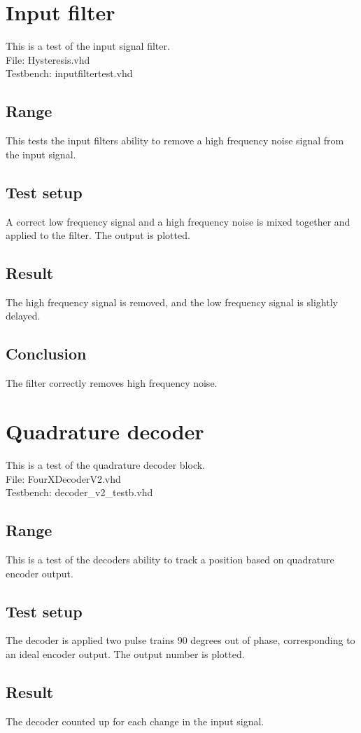 \section{Input filter}
This is a test of the input signal filter.\\
File: Hysteresis.vhd\\
Testbench: inputfiltertest.vhd
\subsection{Range}
This tests the input filters ability to remove a high frequency noise signal from the input signal.
\subsection{Test setup}
A correct low frequency signal and a high frequency noise is mixed together and applied to the filter. The output is plotted.
\subsection{Result}
The high frequency signal is removed, and the low frequency signal is slightly delayed.
\subsection{Conclusion}
The filter correctly removes high frequency noise.

\section{Quadrature decoder}
This is a test of the quadrature decoder block.\\
File: FourXDecoderV2.vhd\\
Testbench: decoder\_v2\_testb.vhd
\subsection{Range}
This is a test of the decoders ability to track a position based on quadrature encoder output.
\subsection{Test setup}
The decoder is applied two pulse trains 90 degrees out of phase, corresponding to an ideal encoder output. The output number is plotted.
\subsection{Result}
The decoder counted up for each change in the input signal.
